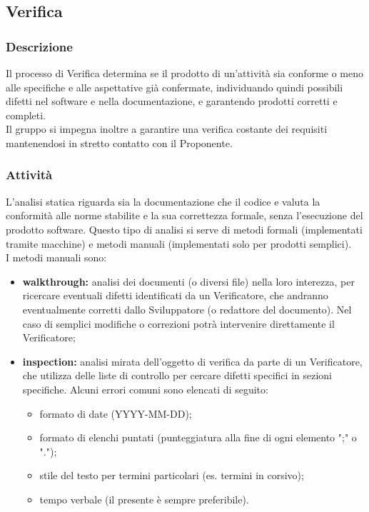 \subsection{Verifica}
    \subsubsection{Descrizione}
	Il processo di Verifica determina se il prodotto di un'attività sia conforme o meno alle specifiche e alle aspettative già confermate, individuando quindi possibili difetti nel software e nella documentazione, e garantendo prodotti corretti e completi. \\
	Il gruppo si impegna inoltre a garantire una verifica costante dei requisiti mantenendosi in stretto contatto con il Proponente. 
		
    \subsubsection{Attività}
          L'analisi statica riguarda sia la documentazione che il codice e valuta la conformità alle norme stabilite e la sua correttezza formale, senza l'esecuzione del prodotto software. Questo tipo di analisi si serve di metodi formali (implementati tramite macchine) e metodi manuali (implementati solo per prodotti semplici).\\ I metodi manuali sono:
          \begin{itemize}
            \item \textbf{walkthrough:} analisi dei documenti (o diversi file) nella loro interezza, per ricercare eventuali difetti identificati da un Verificatore, che andranno eventualmente corretti dallo Sviluppatore (o redattore del documento). Nel caso di semplici modifiche o correzioni potrà intervenire direttamente il Verificatore;
            \item \textbf{inspection:} analisi mirata dell'oggetto di verifica da parte di un Verificatore, che utilizza delle liste di controllo per cercare difetti specifici in sezioni specifiche. Alcuni errori comuni sono elencati di seguito:
              \begin{itemize}
                \item formato di date (YYYY-MM-DD);
                \item formato di elenchi puntati (punteggiatura alla fine di ogni elemento ";" o ".");
                \item stile del testo per termini particolari (es. termini in corsivo);
                \item tempo verbale (il presente è sempre preferibile).
              \end{itemize}
          \end{itemize}

